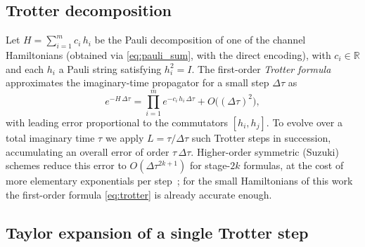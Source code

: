 \subsection{Trotter decomposition}
\label{ssec:trotter}

Let $H = \sum_{i=1}^{m} c_i\, h_i$ be the Pauli decomposition of one of
the channel Hamiltonians (obtained via \cref{eq:pauli_sum}, with the
direct encoding), with $c_i\in\mathbb{R}$ and each $h_i$ a Pauli string
satisfying $h_i^{2} = I$. The first-order \emph{Trotter
formula}~\cite{trotter1959,suzuki1976} approximates the imaginary-time
propagator for a small step $\Delta\tau$ as
\begin{equation}
  \label{eq:trotter}
  e^{-H\,\Delta\tau}
  = \prod_{i=1}^{m} e^{-c_i\,h_i\,\Delta\tau}
  + O\!\bigl((\Delta\tau)^{2}\bigr),
\end{equation}
with leading error proportional to the commutators $[h_i, h_j]$. To
evolve over a total imaginary time $\tau$ we apply $L = \tau/\Delta\tau$
such Trotter steps in succession, accumulating an overall error of order
$\tau\,\Delta\tau$. Higher-order symmetric (Suzuki) schemes reduce this
error to $O(\Delta\tau^{2k+1})$ for stage-$2k$ formulas, at the cost of
more elementary exponentials per step~\cite{suzuki1976}; for the small
Hamiltonians of this work the first-order formula \cref{eq:trotter} is
already accurate enough.

\subsection{Taylor expansion of a single Trotter step}
\label{ssec:taylor_step}

